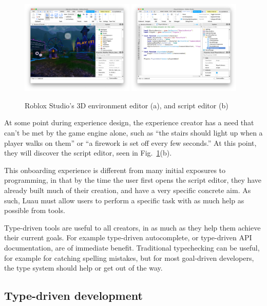 \documentclass[acmsmall]{acmart}
\begin{document}
\begin{figure}
\includegraphics[width=0.48\textwidth]{studio-mow.png}
\includegraphics[width=0.48\textwidth]{studio-script-editor.png}
\caption{Roblox Studio's 3D environment editor (a), and script editor (b)}
\label{fig:studio}
\end{figure}

At some point during experience design, the experience creator has a need
that can't be met by the game engine alone, such as ``the stairs should
light up when a player walks on them'' or ``a firework is set off
every few seconds.'' At this point, they will discover the script
editor, seen in Fig.~\ref{fig:studio}(b).

This onboarding experience is different from many initial exposures to
programming, in that by the time the user first opens the script
editor, they have already built much of their creation, and have a
very specific concrete aim. As such, Luau must allow users to perform a
specific task with as much help as possible from tools.

Type-driven tools are useful to all creators, in as much as they help
them achieve their current goals. For example type-driven
autocomplete, or type-driven API documentation, are of immediate
benefit. Traditional typechecking can be useful, for example for
catching spelling mistakes, but for most goal-driven developers, the
type system should help or get out of the way.

\subsection{Type-driven development}
\end{document}
